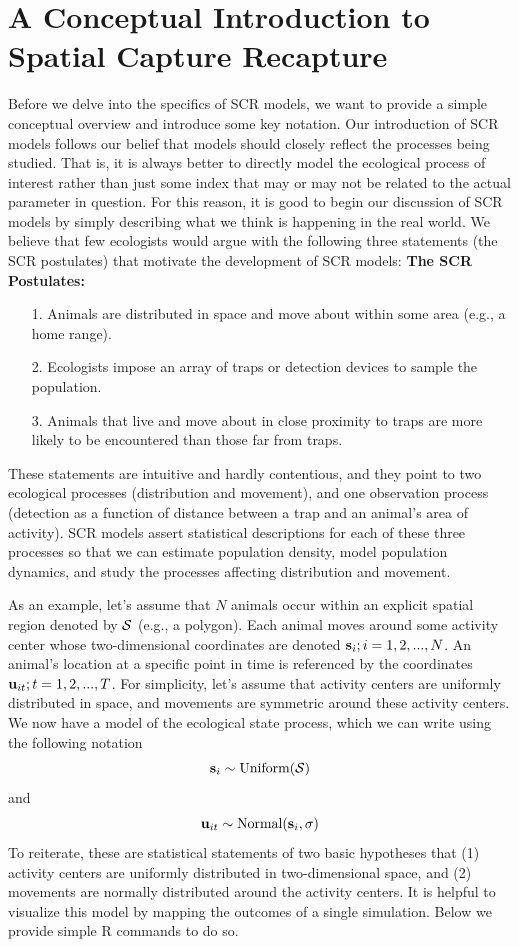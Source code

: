\section{A Conceptual Introduction to Spatial Capture Recapture}

Before we delve into the specifics of SCR models, we want to provide a simple
conceptual overview and introduce some key notation. Our introduction
of SCR models follows our belief that models should closely reflect
the processes being studied. That is, it is always better to directly
model the ecological process of interest rather than just some index
that may or may not be related to the actual parameter in
question. For this reason, it is good to begin our discussion of SCR
models by simply describing what we think is happening in the real
world. We believe that few ecologists would argue with the following
three statements (the SCR postulates) that motivate the development of
SCR models:
{\flushleft \bf The SCR Postulates:}
\begin{itemize}
\item[1.] Animals are distributed in space and move about within some area (e.g., a home range).
\item[2.] Ecologists impose an array of traps or detection devices to sample the population. 
\item[3.] Animals that live and move about in close proximity to traps are more likely to be encountered than those far from traps.
\end{itemize}
These statements are intuitive and hardly contentious, and they point
to two ecological processes (distribution and movement), and one
observation process (detection as a function of distance between a
trap and an animal's area of activity). SCR models assert statistical
descriptions for each of these three processes so that we can estimate
population density, model population dynamics, and study the processes
affecting distribution and movement.

As an example, let's assume that $N$ animals occur within an explicit
spatial region denoted by ${\cal S}$
(e.g., a polygon).  Each animal moves around some activity center
whose two-dimensional coordinates are denoted ${\bf s}_i;
i=1,2,...,N$. An animal's location at a specific point in time is
referenced by the coordinates ${\bf u}_{it}; t=1,2,...,T$. For
simplicity, let's assume that activity centers are uniformly
distributed in space, and movements are symmetric around these
activity centers. We now have a model of the ecological state process,
which we can write using the following notation
\[
{\bf s}_{i} \sim \mbox{Uniform}({\cal S})
\]
and
\[
{\bf u}_{it} \sim \mbox{Normal}({\bf s}_{i}, \sigma)
\]
To reiterate, these are statistical statements of two basic hypotheses
that (1) activity centers are uniformly distributed in two-dimensional
space, and (2) movements are normally distributed around the activity
centers. It is helpful to visualize this model by mapping the outcomes
of a single simulation. Below we provide simple R commands to do so.

